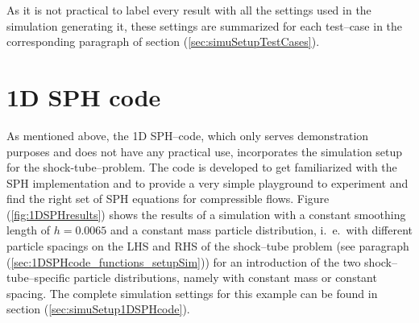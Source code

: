 \documentclass{report}
\begin{document}
As it is not practical to label every result with all the settings used in the simulation generating it, these settings are summarized for each test--case in the corresponding paragraph of section (\ref{sec:simuSetupTestCases}).

\section{1D SPH code}
\label{sec:1DSPHcodeResults}
As mentioned above, the 1D SPH--code, which only serves demonstration purposes and does not have any practical use, incorporates the simulation setup for the shock-tube--problem. The code is developed to get familiarized with the SPH implementation and to provide a very simple playground to experiment and find the right set of SPH equations for compressible flows. Figure (\ref{fig:1DSPHresults}) shows the results of a simulation with a constant smoothing length of $h=0.0065$ and a constant mass particle distribution, i.\ e.\ with different particle spacings on the LHS and RHS of the shock--tube problem (see paragraph (\ref{sec:1DSPHcode_functions_setupSim})) for an introduction of the two shock--tube--specific particle distributions, namely with constant mass or constant spacing. The complete simulation settings for this example can be found in section (\ref{sec:simuSetup1DSPHcode}). 
\end{document}
